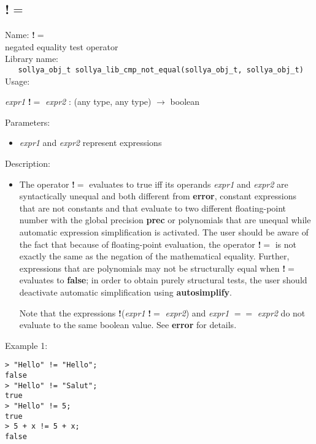\subsection{!$=$}
\label{labneq}
\noindent Name: \textbf{!$=$}\\
\phantom{aaa}negated equality test operator\\[0.2cm]
\noindent Library name:\\
\verb|   sollya_obj_t sollya_lib_cmp_not_equal(sollya_obj_t, sollya_obj_t)|\\[0.2cm]
\noindent Usage: 
\begin{center}
\emph{expr1} \textbf{!$=$} \emph{expr2} : (\textsf{any type}, \textsf{any type}) $\rightarrow$ \textsf{boolean}\\
\end{center}
Parameters: 
\begin{itemize}
\item \emph{expr1} and \emph{expr2} represent expressions
\end{itemize}
\noindent Description: \begin{itemize}

\item The operator \textbf{!$=$} evaluates to true iff its operands \emph{expr1} and
   \emph{expr2} are syntactically unequal and both different from \textbf{error},
   constant expressions that are not constants and that evaluate to two
   different floating-point number with the global precision \textbf{prec} or 
   polynomials that are unequal while automatic expression simplification 
   is activated. The user should be aware of the fact that because of 
   floating-point evaluation, the operator \textbf{!$=$} is not exactly the 
   same as the negation of the mathematical equality. Further, expressions 
   that are polynomials may not be structurally equal when \textbf{!$=$} evaluates 
   to \textbf{false}; in order to obtain purely structural tests, the user should 
   deactivate automatic simplification using \textbf{autosimplify}.
     
   Note that the expressions \textbf{!}(\emph{expr1} \textbf{!$=$} \emph{expr2}) and \emph{expr1}
   \textbf{$==$} \emph{expr2} do not evaluate to the same boolean value. See \textbf{error}
   for details.
\end{itemize}
\noindent Example 1: 
\begin{center}\begin{minipage}{15cm}\begin{Verbatim}[frame=single,commandchars=\\\|\~]
> "Hello" != "Hello";
false
> "Hello" != "Salut";
true
> "Hello" != 5;
true
> 5 + x != 5 + x;
false
\end{Verbatim}
\end{minipage}\end{center}
